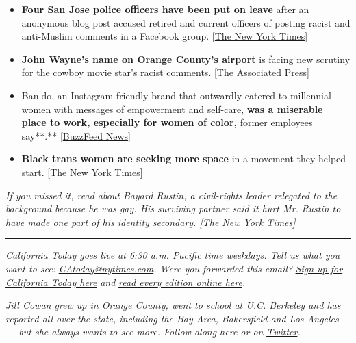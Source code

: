 \begin{itemize}
\item
  \textbf{Four San Jose police officers have been put on leave} after an
  anonymous blog post accused retired and current officers of posting
  racist and anti-Muslim comments in a Facebook group.
  {[}\href{https://www.nytimes.com/2020/06/28/us/san-jose-police-facebook.html?smid=tw-nytimes\&smtyp=cur}{The
  New York Times}{]}
\item
  \textbf{John Wayne's name on Orange County's airport} is facing new
  scrutiny for the cowboy movie star's racist comments.
  {[}\href{https://apnews.com/880ee2b8c9c02bd95ce902a5c3343b1f}{The
  Associated Press}{]}
\item
  Ban.do, an Instagram-friendly brand that outwardly catered to
  millennial women with messages of empowerment and self-care,
  \textbf{was a miserable place to work, especially for women of color,}
  former employees say**.**
  {[}\href{https://www.buzzfeednews.com/article/stephaniemcneal/bando-jen-gotch-lifeguard-press-racist-toxic-behavior}{BuzzFeed
  News}{]}
\item
  \textbf{Black trans women are seeking more space} in a movement they
  helped start.
  {[}\href{https://www.nytimes.com/2020/06/27/us/politics/black-trans-lives-matter.html?referringSource=articleShare}{The
  New York Times}{]}
\end{itemize}

\emph{If you missed it, read about Bayard Rustin, a civil-rights leader
relegated to the background because he was gay. His surviving partner
said it hurt Mr. Rustin to have made one part of his identity secondary.
{[}}\href{https://www.nytimes.com/2020/01/21/us/california-mlk-lgbtq-bayard-rustin.html}{\emph{The
New York Times}}\emph{{]}}

\begin{center}\rule{0.5\linewidth}{\linethickness}\end{center}

\emph{California Today goes live at 6:30 a.m. Pacific time weekdays.
Tell us what you want to see:}
\href{mailto:CAtoday@nytimes.com}{\emph{CAtoday@nytimes.com}}\emph{.
Were you forwarded this email?}
\href{https://www.nytimes.com/newsletters/california-today?module=inline}{\emph{Sign
up for California Today here}} \emph{and}
\href{https://www.nytimes.com/column/california-today}{\emph{read every
edition online here}}\emph{.}

\emph{Jill Cowan grew up in Orange County, went to school at U.C.
Berkeley and has reported all over the state, including the Bay Area,
Bakersfield and Los Angeles --- but she always wants to see more. Follow
along here or on}
\href{https://twitter.com/JillCowan}{\emph{Twitter}}\emph{.}

